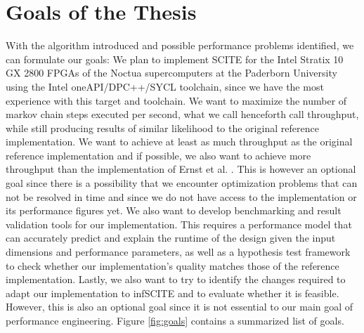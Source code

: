 \section{Goals of the Thesis}


With the algorithm introduced and possible performance problems identified, we can formulate our goals: We plan to implement \ac{SCITE} for the Intel Stratix 10 GX 2800 \acp{FPGA} of the Noctua supercomputers at the Paderborn University using the Intel oneAPI/DPC++/SYCL toolchain, since we have the most experience with this target and toolchain. We want to maximize the number of markov chain steps executed per second, what we call henceforth call throughput, while still producing results of similar likelihood to the original reference implementation. We want to achieve at least as much throughput as the original reference implementation and if possible, we also want to achieve more throughput than the implementation of Ernst et al. \cite{ernst2020Performance}. This is however an optional goal since there is a possibility that we encounter optimization problems that can not be resolved in time and since we do not have access to the implementation or its performance figures yet. We also want to develop benchmarking and result validation tools for our implementation. This requires a performance model that can accurately predict and explain the runtime of the design given the input dimensions and performance parameters, as well as a hypothesis test framework to check whether our implementation's quality matches those of the reference implementation. Lastly, we also want to try to identify the changes required to adapt our implementation to \ac{infSCITE} and to evaluate whether it is feasible. However, this is also an optional goal since it is not essential to our main goal of performance engineering. Figure \ref{fig:goals} contains a summarized list of goals.

